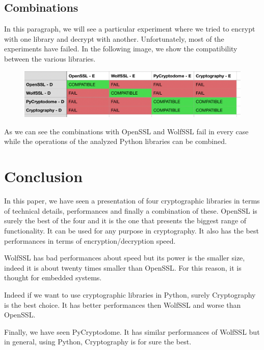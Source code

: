 \documentclass[11pt]{article}
\begin{document}
\subsection{Combinations}
In this paragraph, we will see a particular experiment where we tried to encrypt with one library and decrypt with another. Unfortunately, most of the experiments have failed. In the following image, we show the compatibility between the various libraries.

\begin{figure}[!ht]
 \includegraphics[width=1\textwidth]{pic4-hw4-1635747}
 \label{fig:Compatibility}
\end{figure}

As we can see the combinations with OpenSSL and WolfSSL fail in every case while the operations of the analyzed Python libraries can be combined.

\section{Conclusion}
In this paper, we have seen a presentation of four cryptographic libraries in terms of technical details, performances and finally a combination of these. OpenSSL is surely the best of the four and it is the one that presents the biggest range of functionality. It can be used for any purpose in cryptography. It also has the best performances in terms of encryption/decryption speed.

WolfSSL has bad performances about speed but its power is the smaller size, indeed it is about twenty times smaller than OpenSSL. For this reason, it is thought for embedded systems.

Indeed if we want to use cryptographic libraries in Python, surely Cryptography is the best choice. It has better performances then WolfSSL and worse than OpenSSL.

Finally, we have seen PyCryptodome. It has similar performances of WolfSSL but in general, using Python, Cryptography is for sure the best.
\end{document}

